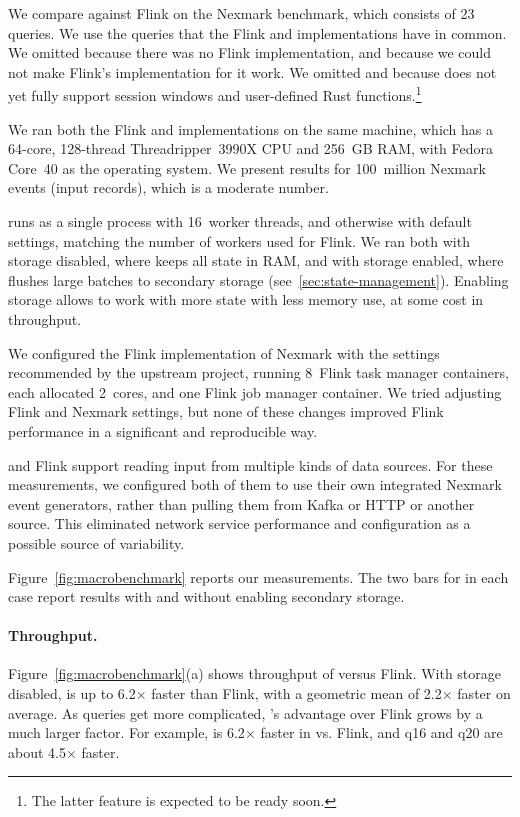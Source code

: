 We compare \dbsp against Flink on the Nexmark benchmark, which
consists of 23 queries.  We use the queries that the Flink and \dbsp
implementations have in common.  We omitted  because there
was no Flink implementation, and  because we could not make
Flink's implementation for it work.  We omitted  and
 because \dbsp does not yet fully support session windows
and user-defined Rust functions.\footnote{The latter feature is
expected to be ready soon.}

We ran both the Flink and \dbsp implementations on the same machine,
which has a 64-core, 128-thread Threadripper~3990X CPU and 256~GB RAM,
with Fedora Core~40 as the operating system. We present results for
100~million Nexmark events (input records), which is a moderate
number.

\dbsp runs as a single process with 16~worker threads, and otherwise
with default settings, matching the number of workers used for Flink.
We ran \dbsp both with storage disabled, where \dbsp keeps all state
in RAM, and with storage enabled, where \dbsp flushes large batches to
secondary storage (see~\ref{sec:state-management}).  Enabling storage
allows \dbsp to work with more state with less memory use, at some
cost in throughput.

We configured the Flink implementation of Nexmark with the settings
recommended by the upstream project, running 8~Flink task manager
containers, each allocated 2~cores, and one Flink job manager
container.  We tried adjusting Flink and Nexmark settings, but none of
these changes improved Flink performance in a significant and
reproducible way.

\dbsp and Flink support reading input from multiple kinds of data
sources.  For these measurements, we configured both of them to use
their own integrated Nexmark event generators, rather than pulling
them from Kafka or HTTP or another source.  This eliminated network
service performance and configuration as a possible source of
variability.

Figure~\ref{fig:macrobenchmark} reports our measurements.  The two
bars for \dbsp in each case report results with and without enabling
secondary storage.

\paragraph{Throughput.}

\newcommand{\x}{\(\times\)}

Figure~\ref{fig:macrobenchmark}(a) shows throughput of \dbsp versus
Flink.  With storage disabled, \dbsp is up to 6.2\x{} faster than Flink, with a
geometric mean of 2.2\x{} faster on average.  As queries get more
complicated, \dbsp's advantage over Flink grows by a much larger
factor.  For example,  is 6.2\x{} faster in \dbsp vs. Flink,
and q16 and q20 are about 4.5\x{} faster.

